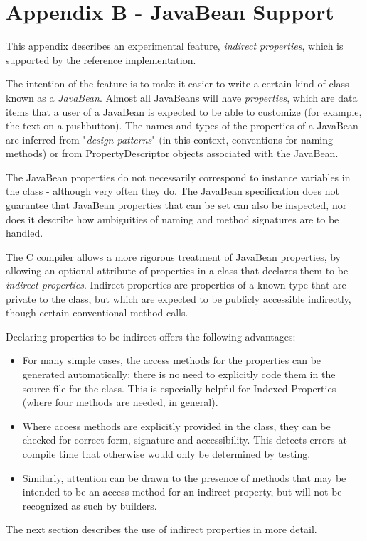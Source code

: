 \chapter{Appendix B - JavaBean Support}\label{refappb}
 
This appendix describes an experimental feature, \emph{indirect
properties}, which is supported by the \nr{} reference
implementation.
 
The intention of the feature is to make it easier to write a certain
kind of class known as a \emph{JavaBean}.
Almost all JavaBeans will have \emph{properties}, which are data items
that a user of a JavaBean is expected to be able to customize (for
example, the text on a pushbutton).  The names and types of the
properties of a JavaBean are inferred from "\emph{design
patterns}" (in this context, conventions for naming methods) or
from PropertyDescriptor objects associated with the JavaBean.
 
The JavaBean properties do not necessarily correspond to instance
variables in the class - although very often they do.  The
JavaBean specification does not guarantee that JavaBean properties
that can be set can also be inspected, nor does it describe how
ambiguities of naming and method signatures are to be handled.
 
The \nr{}C compiler
allows a more rigorous
treatment of JavaBean properties, by allowing an optional attribute of
properties in a class that declares them to be \emph{indirect
properties}.  Indirect properties are properties of a known type
that are private to the class, but which are expected to be publicly
accessible indirectly, though certain conventional method calls.
 
Declaring properties to be indirect offers the following advantages:
\begin{itemize}
\item For many simple cases, the access methods for the properties can be
generated automatically; there is no need to explicitly code them in the
source file for the class.  This is especially helpful for Indexed
Properties (where four methods are needed, in general).
\item Where access methods are explicitly provided in the class, they can
be checked for correct form, signature and accessibility.  This detects
errors at compile time that otherwise would only be determined by
testing.
\item Similarly, attention can be drawn to the presence of methods that
may be intended to be an access method for an indirect property, but
will not be recognized as such by builders.
\end{itemize}
 The next section describes the use of indirect properties in more
detail.

